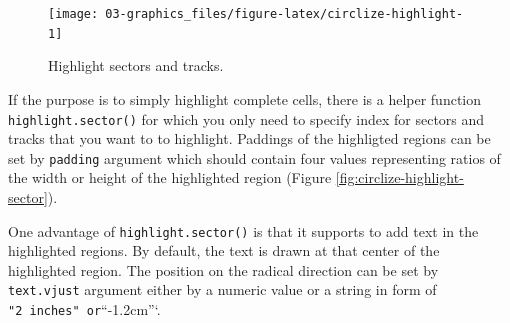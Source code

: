 \documentclass[]{book}
\newenvironment{Shaded}{\begin{snugshade}}{\end{snugshade}}
\newcommand{\KeywordTok}[1]{\textcolor[rgb]{0.13,0.29,0.53}{\textbf{#1}}}
\newcommand{\DataTypeTok}[1]{\textcolor[rgb]{0.13,0.29,0.53}{#1}}
\newcommand{\DecValTok}[1]{\textcolor[rgb]{0.00,0.00,0.81}{#1}}
\newcommand{\FloatTok}[1]{\textcolor[rgb]{0.00,0.00,0.81}{#1}}
\newcommand{\StringTok}[1]{\textcolor[rgb]{0.31,0.60,0.02}{#1}}
\newcommand{\OtherTok}[1]{\textcolor[rgb]{0.56,0.35,0.01}{#1}}
\newcommand{\NormalTok}[1]{#1}
\theoremstyle{definition}
\theoremstyle{definition}
\theoremstyle{remark}
\begin{document}
\begin{Shaded}
\end{Shaded}

\begin{figure}

{\centering \texttt{[image: 03-graphics\_files/figure-latex/circlize-highlight-1]} 

}

\caption{Highlight sectors and tracks.}\label{fig:circlize-highlight}
\end{figure}

If the purpose is to simply highlight complete cells, there is a helper
function \texttt{highlight.sector()} for which you only need to specify
index for sectors and tracks that you want to to highlight. Paddings of
the highligted regions can be set by \texttt{padding} argument which
should contain four values representing ratios of the width or height of
the highlighted region (Figure \ref{fig:circlize-highlight-sector}).

One advantage of \texttt{highlight.sector()} is that it supports to add
text in the highlighted regions. By default, the text is drawn at that
center of the highlighted region. The position on the radical direction
can be set by \texttt{text.vjust} argument either by a numeric value or
a string in form of
\texttt{"2\ inches"\textasciigrave{}\textasciigrave{}\ or}``-1.2cm''`.
\end{document}
